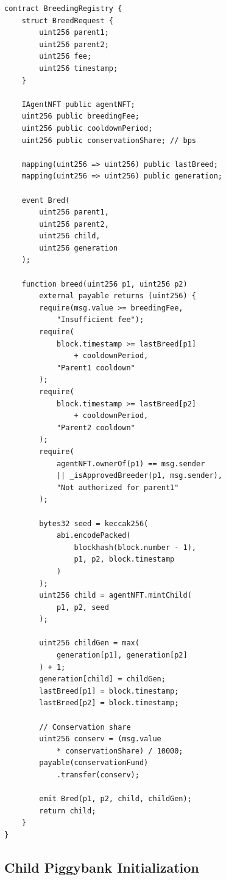 \documentclass[11pt,letterpaper]{article}
\begin{document}
\begin{lstlisting}[language=Solidity,caption=BreedingRegistry.sol]
contract BreedingRegistry {
    struct BreedRequest {
        uint256 parent1;
        uint256 parent2;
        uint256 fee;
        uint256 timestamp;
    }

    IAgentNFT public agentNFT;
    uint256 public breedingFee;
    uint256 public cooldownPeriod;
    uint256 public conservationShare; // bps

    mapping(uint256 => uint256) public lastBreed;
    mapping(uint256 => uint256) public generation;

    event Bred(
        uint256 parent1,
        uint256 parent2,
        uint256 child,
        uint256 generation
    );

    function breed(uint256 p1, uint256 p2)
        external payable returns (uint256) {
        require(msg.value >= breedingFee,
            "Insufficient fee");
        require(
            block.timestamp >= lastBreed[p1]
                + cooldownPeriod,
            "Parent1 cooldown"
        );
        require(
            block.timestamp >= lastBreed[p2]
                + cooldownPeriod,
            "Parent2 cooldown"
        );
        require(
            agentNFT.ownerOf(p1) == msg.sender
            || _isApprovedBreeder(p1, msg.sender),
            "Not authorized for parent1"
        );

        bytes32 seed = keccak256(
            abi.encodePacked(
                blockhash(block.number - 1),
                p1, p2, block.timestamp
            )
        );
        uint256 child = agentNFT.mintChild(
            p1, p2, seed
        );

        uint256 childGen = max(
            generation[p1], generation[p2]
        ) + 1;
        generation[child] = childGen;
        lastBreed[p1] = block.timestamp;
        lastBreed[p2] = block.timestamp;

        // Conservation share
        uint256 conserv = (msg.value
            * conservationShare) / 10000;
        payable(conservationFund)
            .transfer(conserv);

        emit Bred(p1, p2, child, childGen);
        return child;
    }
}
\end{lstlisting}

\subsection{Child Piggybank Initialization}
\end{document}
